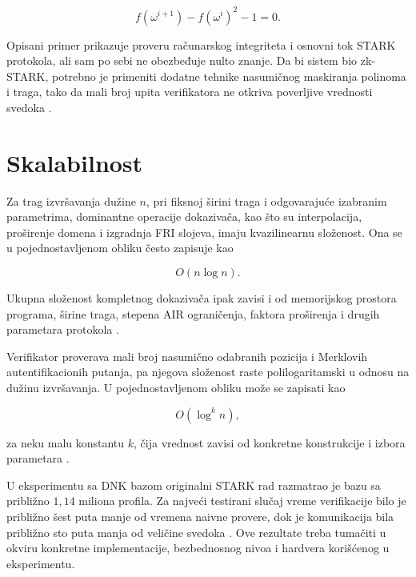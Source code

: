 \begin{equation}
    f\left(\omega^{i+1}\right)
    - f\left(\omega^i\right)^2
    - 1 = 0.
\end{equation}

Opisani primer prikazuje proveru računarskog integriteta i osnovni tok STARK
protokola, ali sam po sebi ne obezbeđuje nulto znanje. Da bi sistem bio
zk-STARK, potrebno je primeniti dodatne tehnike nasumičnog maskiranja
polinoma i traga, tako da mali broj upita verifikatora ne otkriva poverljive
vrednosti svedoka \cite{stark2018,ethstark2023}.


\section{Skalabilnost}

Za trag izvršavanja dužine \(n\), pri fiksnoj širini traga i odgovarajuće
izabranim parametrima, dominantne operacije dokazivača, kao što su
interpolacija, proširenje domena i izgradnja FRI slojeva, imaju kvazilinearnu
složenost. Ona se u pojednostavljenom obliku često zapisuje kao

\begin{equation}
    O(n\log n).
\end{equation}

Ukupna složenost kompletnog dokazivača ipak zavisi i od memorijskog prostora
programa, širine traga, stepena AIR ograničenja, faktora proširenja i drugih
parametara protokola \cite{stark2018,ethstark2023}.

Verifikator proverava mali broj nasumično odabranih pozicija i Merklovih
autentifikacionih putanja, pa njegova složenost raste polilogaritamski u odnosu
na dužinu izvršavanja. U pojednostavljenom obliku može se zapisati kao

\begin{equation}
    O\left(\log^k n\right),
\end{equation}

za neku malu konstantu \(k\), čija vrednost zavisi od konkretne konstrukcije i
izbora parametara \cite{stark2018}.

U eksperimentu sa DNK bazom originalni STARK rad razmatrao je bazu sa približno
\(1{,}14\) miliona profila. Za najveći testirani slučaj vreme verifikacije bilo
je približno šest puta manje od vremena naivne provere, dok je komunikacija bila
približno sto puta manja od veličine svedoka \cite{stark2018}. Ove rezultate
treba tumačiti u okviru konkretne implementacije, bezbednosnog nivoa i hardvera
korišćenog u eksperimentu.


